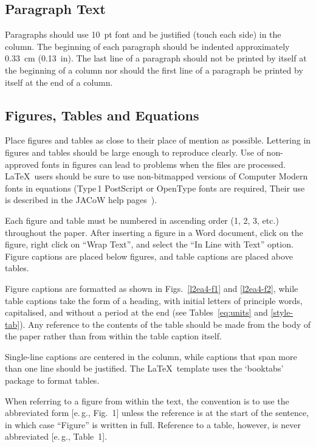 \documentclass[a4paper,
              ]{jacow}
\begin{document}
\subsection{Paragraph Text}

Paragraphs should use \SI{10}{pt} font and be justified (touch each side) in
the column. The beginning of each paragraph should be indented
approximately \SI{0.33}{cm} (\SI{0.13}{in}). The last line of a paragraph should not be
printed by itself at the beginning of a column nor should the first line of
a paragraph be printed by itself at the end of a column.

\subsection{Figures, Tables and Equations}

Place figures and tables as close to their place of mention as
possible. Lettering in figures and tables should be large enough to
reproduce clearly. Use of non-approved fonts in figures can lead to
problems when the files are processed. \LaTeX\ users should be sure to use
non-bitmapped versions of Computer Modern fonts in equations (Type\,1 PostScript
or OpenType fonts are required, Their use is described in the JACoW help
pages~\cite{jacow-help}).

Each figure and table must be numbered in ascending
order (1, 2, 3, etc.) throughout the paper. After inserting a
figure in a Word document, click on the figure, right click
on “Wrap Text”, and select the “In Line with Text” option.
Figure captions are placed below figures, and table
captions are placed above tables.

Figure captions are formatted as shown in Figs.~\ref{l2ea4-f1} and \ref{l2ea4-f2},
while table captions take the form of a heading,
with initial letters of principle words, capitalised, and
without a period at the end (see Tables~\ref{eq:units} and \ref{style-tab}).
Any reference to the contents of the table should be made from
the body of the paper rather than from within the table
caption itself.

 Single-line captions are centered in the column, while captions
that span more than one line should be justified.
The \LaTeX\ template uses the ‘booktabs’ package to
format tables.

When referring to a figure from within the text, the
convention is to use the abbreviated form [e.\,g., Fig.~1]
unless the reference is at the start of the sentence, in
which case “Figure” is written in full. Reference to a
table, however, is never abbreviated [e.\,g., Table~1].
\end{document}
